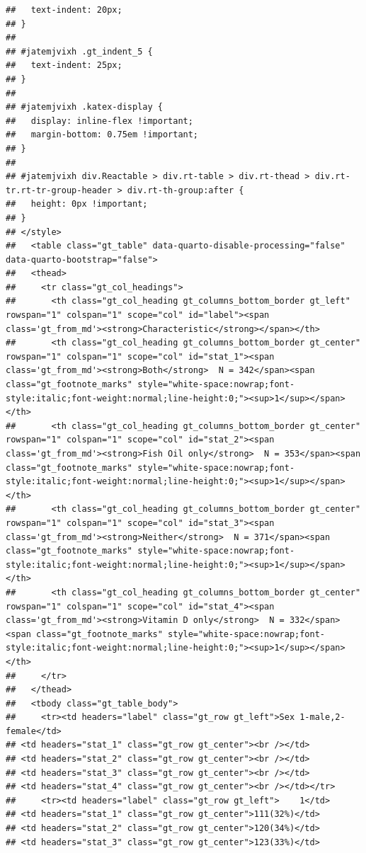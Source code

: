 \documentclass{article}
\begin{document}
\begin{verbatim}
##   text-indent: 20px;
## }
## 
## #jatemjvixh .gt_indent_5 {
##   text-indent: 25px;
## }
## 
## #jatemjvixh .katex-display {
##   display: inline-flex !important;
##   margin-bottom: 0.75em !important;
## }
## 
## #jatemjvixh div.Reactable > div.rt-table > div.rt-thead > div.rt-tr.rt-tr-group-header > div.rt-th-group:after {
##   height: 0px !important;
## }
## </style>
##   <table class="gt_table" data-quarto-disable-processing="false" data-quarto-bootstrap="false">
##   <thead>
##     <tr class="gt_col_headings">
##       <th class="gt_col_heading gt_columns_bottom_border gt_left" rowspan="1" colspan="1" scope="col" id="label"><span class='gt_from_md'><strong>Characteristic</strong></span></th>
##       <th class="gt_col_heading gt_columns_bottom_border gt_center" rowspan="1" colspan="1" scope="col" id="stat_1"><span class='gt_from_md'><strong>Both</strong>  N = 342</span><span class="gt_footnote_marks" style="white-space:nowrap;font-style:italic;font-weight:normal;line-height:0;"><sup>1</sup></span></th>
##       <th class="gt_col_heading gt_columns_bottom_border gt_center" rowspan="1" colspan="1" scope="col" id="stat_2"><span class='gt_from_md'><strong>Fish Oil only</strong>  N = 353</span><span class="gt_footnote_marks" style="white-space:nowrap;font-style:italic;font-weight:normal;line-height:0;"><sup>1</sup></span></th>
##       <th class="gt_col_heading gt_columns_bottom_border gt_center" rowspan="1" colspan="1" scope="col" id="stat_3"><span class='gt_from_md'><strong>Neither</strong>  N = 371</span><span class="gt_footnote_marks" style="white-space:nowrap;font-style:italic;font-weight:normal;line-height:0;"><sup>1</sup></span></th>
##       <th class="gt_col_heading gt_columns_bottom_border gt_center" rowspan="1" colspan="1" scope="col" id="stat_4"><span class='gt_from_md'><strong>Vitamin D only</strong>  N = 332</span><span class="gt_footnote_marks" style="white-space:nowrap;font-style:italic;font-weight:normal;line-height:0;"><sup>1</sup></span></th>
##     </tr>
##   </thead>
##   <tbody class="gt_table_body">
##     <tr><td headers="label" class="gt_row gt_left">Sex 1-male,2-female</td>
## <td headers="stat_1" class="gt_row gt_center"><br /></td>
## <td headers="stat_2" class="gt_row gt_center"><br /></td>
## <td headers="stat_3" class="gt_row gt_center"><br /></td>
## <td headers="stat_4" class="gt_row gt_center"><br /></td></tr>
##     <tr><td headers="label" class="gt_row gt_left">    1</td>
## <td headers="stat_1" class="gt_row gt_center">111(32%)</td>
## <td headers="stat_2" class="gt_row gt_center">120(34%)</td>
## <td headers="stat_3" class="gt_row gt_center">123(33%)</td>

\end{verbatim}
\end{document}
